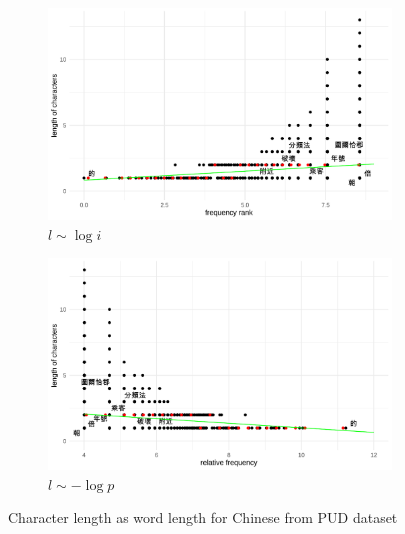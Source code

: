 \begin{figure}[H]
  \centering
  \begin{subfigure}[b]{0.48\textwidth}
    \centering
    \includegraphics[width=\textwidth]{plots/Chinese_logi_cl_PUD.pdf}
    \caption{$l \sim \log i$}
  \end{subfigure}
  \hfill
  \begin{subfigure}[b]{0.48\textwidth}
    \centering
    \includegraphics[width=\textwidth]{plots/Chinese_logp_cl_PUD.pdf}
    \caption{$l \sim -\log p$}
  \end{subfigure}
  \caption{Character length as word length for Chinese from PUD dataset}
\end{figure}

